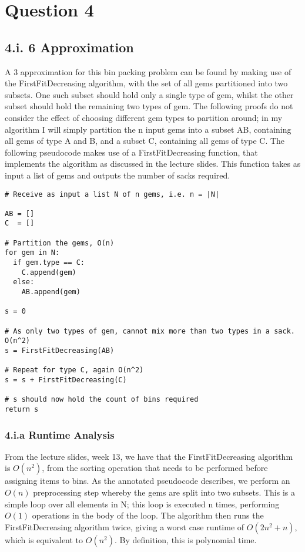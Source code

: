 \documentclass[paper=a4, fontsize=12pt]{article}
\begin{document}
\section{Question 4}

\subsection{4.i. 6 Approximation}

A 3 approximation for this bin packing problem can be found by making use of
the FirstFitDecreasing algorithm, with the set of all gems partitioned into two
subsets. One such subset should hold only a single type of gem, whilst the
other subset should hold the remaining two types of gem. The following proofs
do not consider the effect of choosing different gem types to partition around;
in my algorithm I will simply partition the n input gems into a subset AB,
containing all gems of type A and B, and a subset C, containing all gems of
type C. The following pseudocode makes use of a FirstFitDecreasing function,
that implements the algorithm as discussed in the lecture slides. This function
takes as input a list of gems and outputs the number of sacks required.

\begin{verbatim}
# Receive as input a list N of n gems, i.e. n = |N|

AB = []
C  = []

# Partition the gems, O(n)
for gem in N:
  if gem.type == C:
    C.append(gem)
  else:
    AB.append(gem)

s = 0

# As only two types of gem, cannot mix more than two types in a sack. O(n^2)
s = FirstFitDecreasing(AB)

# Repeat for type C, again O(n^2)
s = s + FirstFitDecreasing(C)

# s should now hold the count of bins required
return s
\end{verbatim}

\subsubsection{4.i.a Runtime Analysis}
From the lecture slides, week 13, we have that the FirstFitDecreasing algorithm
is \(O(n^2)\), from the sorting operation that needs to be performed before
assigning items to bins. As the annotated pseudocode describes, we perform an
\(O(n)\) preprocessing step whereby the gems are split into two subsets. This
is a simple loop over all elements in N; this loop is executed n times,
performing \(O(1)\) operations in the body of the loop. The algorithm then runs
the FirstFitDecreasing algorithm twice, giving a worst case runtime of \(O(2n^2
+ n)\), which is equivalent to \(O(n^2)\). By definition, this is polynomial
time.
\end{document}

